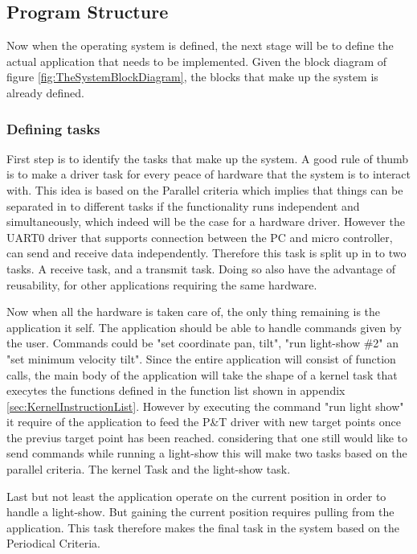 

\subsection{Program Structure}
\label{sec:ProgramStructure}

Now when the operating system is defined, the next stage will be to define the actual application that needs to be implemented. Given the block diagram of figure \ref{fig:TheSystemBlockDiagram}, the blocks that make up the system is already defined.

\subsubsection{Defining tasks}
\label{sec:DefiningTasks}
First step is to identify the tasks that make up the system. A good rule of thumb is to make a driver task for every peace of hardware that the system is to interact with. This idea is based on the Parallel criteria which implies that things can be separated in to different tasks if the functionality runs independent and simultaneously, which indeed will be the case for a hardware driver.
However the UART0 driver that supports connection between the PC and micro controller, can send and receive data independently. Therefore this task is split up in to two tasks. A receive task, and a transmit task.
Doing so also have the advantage of reusability, for other applications requiring the same hardware. 

Now when all the hardware is taken care of, the only thing remaining is the application it self. The application should be able to handle commands given by the user. Commands could be "set coordinate pan, tilt", "run light-show \#2" an "set minimum velocity tilt". Since the entire application will consist of function calls, the main body of the application will take the shape of a kernel task that execytes the functions defined in the function list shown in appendix 
\ref{sec:KernelInstructionList}. However by executing the command "run light show" it require of the application to feed the P\&T driver with new target points once the previus target point has been reached. considering that one still would like to send commands while running a light-show this will make two tasks based on the parallel criteria. The kernel Task and the light-show task.

Last but not least the application operate on the current position in order to handle a light-show. But gaining the current position requires pulling from the application. This task therefore makes the final task in the system based on the Periodical Criteria. 

